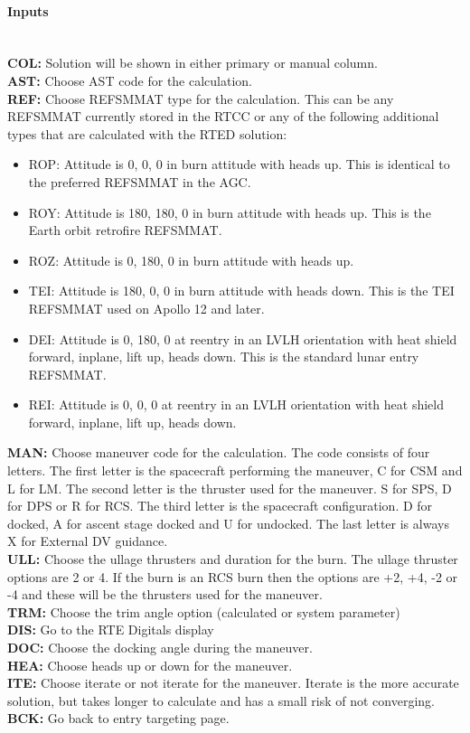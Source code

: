 \documentclass[11pt]{article} %
\begin{document}
\paragraph{Inputs}\mbox{} \\
\textbf{COL:} Solution will be shown in either primary or manual column.\\
\textbf{AST:} Choose AST code for the calculation.\\
\textbf{REF:} Choose REFSMMAT type for the calculation. This can be any REFSMMAT currently stored in the RTCC or any of the following additional types that are calculated with the RTED solution:
\begin{itemize}
	\item ROP: Attitude is 0, 0, 0 in burn attitude with heads up. This is identical to the preferred REFSMMAT in the AGC.
	\item ROY: Attitude is 180, 180, 0 in burn attitude with heads up. This is the Earth orbit retrofire REFSMMAT.
	\item ROZ: Attitude is 0, 180, 0 in burn attitude with heads up.
	\item TEI: Attitude is 180, 0, 0 in burn attitude with heads down. This is the TEI REFSMMAT used on Apollo 12 and later.
  \item DEI: Attitude is 0, 180, 0 at reentry in an LVLH orientation with heat shield forward, inplane, lift up, heads down. This is the standard lunar entry REFSMMAT.
	\item REI: Attitude is 0, 0, 0 at reentry in an LVLH orientation with heat shield forward, inplane, lift up, heads down.
\end{itemize}
\textbf{MAN:} Choose maneuver code for the calculation. The code consists of four letters. The first letter is the spacecraft performing the maneuver, C for CSM and L for LM. The second letter is the thruster used for the maneuver. S for SPS, D for DPS or R for RCS. The third letter is the spacecraft configuration. D for docked, A for ascent stage docked and U for undocked. The last letter is always X for External DV guidance.\\
\textbf{ULL:} Choose the ullage thrusters and duration for the burn. The ullage thruster options are 2 or 4. If the burn is an RCS burn then the options are +2, +4, -2 or -4 and these will be the thrusters used for the maneuver.\\
\textbf{TRM:} Choose the trim angle option (calculated or system parameter)\\

\textbf{DIS:} Go to the RTE Digitals display\\
\textbf{DOC:} Choose the docking angle during the maneuver.\\
\textbf{HEA:} Choose heads up or down for the maneuver.\\
\textbf{ITE:} Choose iterate or not iterate for the maneuver. Iterate is the more accurate solution, but takes longer to calculate and has a small risk of not converging.\\
\textbf{BCK:} Go back to entry targeting page.\\
\end{document}
